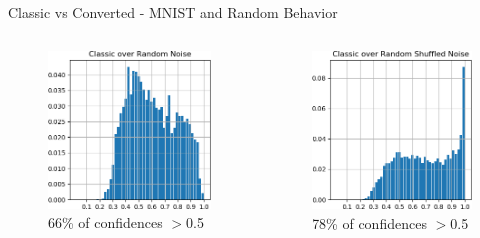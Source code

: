 \documentclass{beamer}
\begin{document}
\begin{frame}{Classic vs Converted - MNIST and Random Behavior}
\begin{columns}
\begin{column}{.33\textwidth}
\begin{figure}
        \includegraphics[width=.93\textwidth]{images/mnist-behavior/classic-hist-random.png}
        \centering \tiny{66\% of confidences $>$0.5}
    \end{figure}
    \end{column}
    \begin{column}{.33\textwidth}
    \begin{figure}
        \includegraphics[width=.91\textwidth]{images/mnist-behavior/classic-hist-shuffled.png}
        \centering \tiny{78\% of confidences $>$0.5}
    \end{figure}
    \end{column}
    \end{columns}
    

\end{frame}
\end{document}
